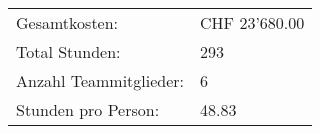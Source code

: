 \begin{table}[H]
\begin{tabular}{ll}
Gesamtkosten: 	 		&CHF 23'680.00 	\\
Total Stunden:			&293			\\
Anzahl Teammitglieder:	&6				\\
Stunden pro Person: 	&48.83			                              
\end{tabular}
\end{table}




